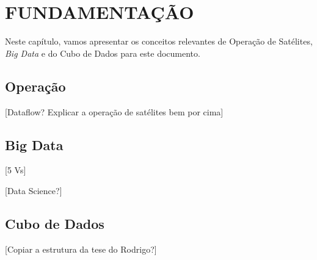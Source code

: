 
\chapter{FUNDAMENTAÇÃO}
\label{ch:fun}

{\color{red}
  Neste capítulo, vamos apresentar os conceitos relevantes de Operação de Satélites, \textit{Big Data} e do Cubo de Dados para este documento.
}

\section{Operação}
\label{ch:fun:operations}

[Dataflow? Explicar a operação de satélites bem por cima]

\section{Big Data}
\label{ch:fun:bigdata}

[5 Vs]

[Data Science?]

{\color{red}
  \section{Cubo de Dados}
  \label{ch:fun:cube}

  [Copiar a estrutura da tese do Rodrigo?]
}
